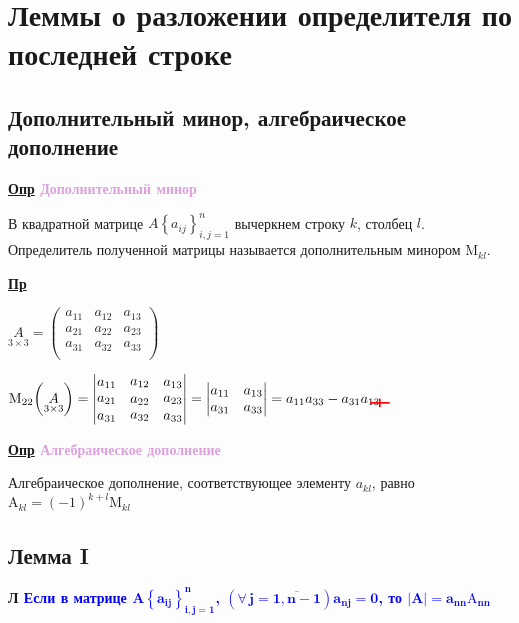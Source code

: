 \documentclass[12pt, a4paper]{report}
\newcommand{\sqbox}{%
	\collectbox{%
		\setlength{\fboxsep}{2pt}%
		\fbox{\BOXCONTENT}%
	}%
}
\newcommand{\tikzmarkempty}[2]{\tikz[overlay,remember picture,baseline=-2pt] \node [anchor=center, inner sep=0] (#1) {$#2$};}
\newcommand{\df}[1][]{\begin{flushleft}\textbf{\underline{Опр} \textcolor{Plum}{#1}}\end{flushleft}}
\newcommand{\ex}{\begin{flushleft}\textbf{\underline{Пр}}\end{flushleft}}
\newcommand{\lm}[1][]{\begin{flushleft}\textbf{\sqbox{Л} \textcolor{Blue}{#1}}\end{flushleft}}
\let\oldforall\forall
\renewcommand{\forall}{\oldforall\,}
\begin{document}
	\section{Леммы о разложении определителя по последней строке}
	\subsection{Дополнительный минор, алгебраическое дополнение}
	\df[Дополнительный минор]
	
	В квадратной матрице $A\left\{a_{ij}\right\}_{i,j=1}^{n}$ вычеркнем строку $k$, столбец $l$. Определитель полученной матрицы называется дополнительным минором $\mathrm{M}_{kl}$.
	
	\ex
	
	$\displaystyle 
	\underset{3\times 3}{A}=\begin{pmatrix}
		a_{11}&a_{12}&a_{13}\\
		a_{21}&a_{22}&a_{23}\\
		a_{31}&a_{32}&a_{33}\\
	\end{pmatrix}
	$
	\bigskip
	
	$\mathrm{M}_{22}\bigg(\underset{3\times 3}{A}\bigg)=
	\begin{vmatrix}
		a_{11}&\tikzmarkempty{A}{a_{12}}&a_{13}\\
		\tikzmarkempty{C}{a_{21}}&a_{22}&\tikzmarkempty{D}{a_{23}}\\
		a_{31}&\tikzmarkempty{B}{a_{32}}&a_{33}\\
	\end{vmatrix}=
	\begin{vmatrix}
		a_{11}&a_{13}\\
		a_{31}&a_{33}\\
	\end{vmatrix}=a_{11}a_{33}-a_{31}a_{13}
	\begin{tikzpicture}[overlay, remember picture]
		\draw[red, very thick] (A.north) to (B.south);
		\draw[red, very thick] (C.west) to (D.east);
	\end{tikzpicture}
	$
	
	\df[Алгебраическое дополнение]
	
	Алгебраическое дополнение, соответствующее элементу $a_{kl}$, равно $\mathrm{A}_{kl}=(-1)^{k+l}\mathrm{M}_{kl}$
	\subsection{Лемма I}\label{2.5.2}
	
	\lm[Если в матрице $\boldsymbol{A\left\{a_{ij}\right\}_{i,j=1}^{n}}$, $\boldsymbol{\left(\forall j=\overline{1,n-1}\right)a_{nj}=0}$, то $\boldsymbol{|A|=a_{nn}\mathrm{A}_{nn}}$]
	
\end{document}
